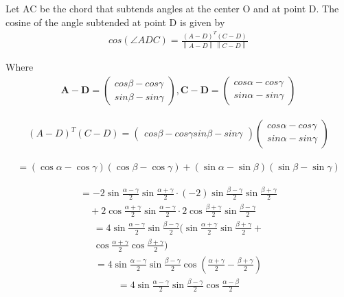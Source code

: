 \documentclass[journal,10pt,twocolumn]{article}
\providecommand{\norm}[1]{\left\lVert#1\right\rVert}
\let\vec\mathbf
\newcommand{\myvec}[1]{\ensuremath{\begin{pmatrix}#1\end{pmatrix}}}
\begin{document}
{Let AC be the chord that subtends angles at the center O and at point D. The cosine of the angle subtended at point D is given by
\begin{align}
	cos(\angle ADC) = \frac{(A-D)^T(C-D)}{\norm{A-D}\norm{C-D}}
	\label{pf2-eq-1}
\end{align}

Where
 \begin{eqnarray}
	\vec{A-D} = \myvec{cos\beta - cos\gamma\\sin\beta - sin\gamma},
	\vec{C-D} = \myvec{cos\alpha - cos\gamma\\sin\alpha - sin\gamma}
\end{eqnarray}
 

\begin{eqnarray*}
	(A-D)^T(C-D)=\myvec{cos\beta - cos\gamma  sin\beta - sin\gamma}
	\myvec{cos\alpha - cos\gamma\\sin\alpha - sin\gamma}
\end{eqnarray*}

\begin{multline*}
	= (\cos\alpha-\cos\gamma)(\cos\beta-\cos\gamma)+(\sin\alpha-\sin\beta)(\sin\beta-\sin\gamma)
\end{multline*}

\begin{multline*}
	= -2\sin\frac{\alpha-\gamma}2\sin\frac{\alpha+\gamma}2 \cdot(-2)\sin\frac{\beta-\gamma}2\sin\frac{\beta+\gamma}2 \\\quad+ 2\cos\frac{\alpha+\gamma}2\sin\frac{\alpha-\gamma}2 \cdot 2\cos\frac{\beta+\gamma}2\sin\frac{\beta-\gamma}2
\end{multline*}
\begin{multline*}
	= 4\sin\frac{\alpha-\gamma}2\sin\frac{\beta-\gamma}2(\sin\frac{\alpha+\gamma}2\sin\frac{\beta+\gamma}2+\\
	\cos\frac{\alpha+\gamma}2\cos\frac{\beta+\gamma}2)
\end{multline*}
\begin{align*}
	= 4\sin\frac{\alpha-\gamma}2\sin\frac{\beta-\gamma}2\cos\left(\frac{\alpha+\gamma}2-\frac{\beta+\gamma}2\right)
\end{align*}
\begin{align}
	= 4\sin\frac{\alpha-\gamma}2\sin\frac{\beta-\gamma}2\cos\frac{\alpha-\beta}2
	\label{pf2-eq-2}
\end{align}

}
\end{document}
